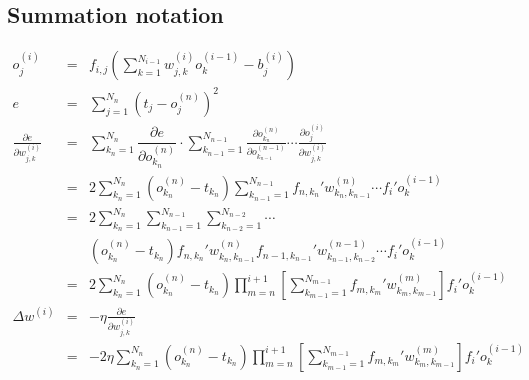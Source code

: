 \documentclass{article}
\newcommand{\cdummy}{\cdot}
\begin{document}
\subsection{Summation notation}

\begin{eqnarray*}
  o_{j}^{(i)} & = & f_{i,j}  \left( \sum^{N_{i-1}}_{k=1} w_{j,k}^{(i)}
  o_{k}^{(i-1)} -b_{j}^{(i)} \right)\\
  e & = & \sum^{N_{n}}_{j=1} (t_{j} -o_{j}^{(n)} )^{2}\\
  \frac{\partial e}{\partial w^{(i)}_{j,k}} & = & \sum_{k_{n} =1}^{N_{n}}
  \dfrac{\partial e}{\partial o_{k_{n}}^{(n)}} \cdummy \sum_{k_{n-1}
  =1}^{N_{n-1}} \frac{\partial o_{k_{n}}^{(n)}}{\partial o_{k_{n-1}}^{(n-1)}}
  \cdots \frac{\partial o_{j}^{(i)}}{\partial w_{j,k}^{(i)}}\\
  & = & 2 \sum^{N_{n}}_{k_{n} =1} (o_{k_{n}}^{(n)} -t_{k_{n}} ) 
  \sum_{k_{n-1} =1}^{N_{n-1}} f_{n,k_{n}}' w_{k_{n} ,k_{n-1}}^{(n)} \cdots
  f_{i}' o_{k}^{(i-1)}\\
  & = & 2 \sum^{N_{n}}_{k_{n} =1} \sum_{k_{n-1} =1}^{N_{n-1}} \sum_{k_{n-2}
  =1}^{N_{n-2}} \cdots\\
  &  & (o_{k_{n}}^{(n)} -t_{k_{n}} ) f_{n,k_{n}}' w_{k_{n} ,k_{n-1}}^{(n)}
  f_{n-1,k_{n-1}}' w^{(n-1)}_{k_{n-1} ,k_{n-2}} \cdots f_{i}' o_{k}^{(i-1)}\\
  & = & 2 \sum^{N_{n}}_{k_{n} =1} (o_{k_{n}}^{(n)} -t_{k_{n}} ) 
  \prod^{i+1}_{m=n} \left[ \sum_{k_{m-1} =1}^{N_{m-1}} f_{m,k_{m}}' w_{k_{m}
  ,k_{m-1}}^{(m)} \right] f_{i}' o_{k}^{(i-1)}\\
  \Delta w^{(i)} & = & - \eta \frac{\partial e}{\partial w^{(i)}_{j,k}}\\
  & = & -2 \eta \sum^{N_{n}}_{k_{n} =1} (o_{k_{n}}^{(n)} -t_{k_{n}} ) 
  \prod^{i+1}_{m=n} \left[ \sum_{k_{m-1} =1}^{N_{m-1}} f_{m,k_{m}}' w_{k_{m}
  ,k_{m-1}}^{(m)} \right] f_{i}' o_{k}^{(i-1)}\\
  &  & \\
  &  & 
\end{eqnarray*}
\end{document}

